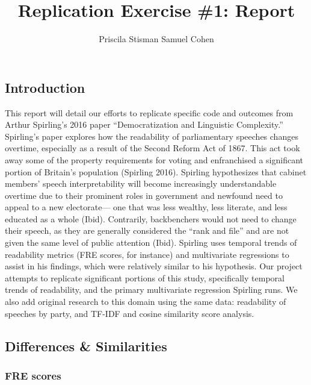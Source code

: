 \documentclass[
  letterpaper,
  DIV=11,
  numbers=noendperiod]{scrartcl}
\title{Replication Exercise \#1: Report}
\author{Priscila Stisman \textbar{} Samuel Cohen}
\date{}
\renewcommand*\contentsname{Table of contents}
\newcommand\contentsname{Table of contents}
\begin{document}
\maketitle

\renewcommand*\contentsname{Table of contents}
{
\hypersetup{linkcolor=}
\setcounter{tocdepth}{3}
\tableofcontents
}

\subsection{Introduction}\label{introduction}

This report will detail our efforts to replicate specific code and
outcomes from Arthur Spirling's 2016 paper ``Democratization and
Linguistic Complexity.'' Spirling's paper explores how the readability
of parliamentary speeches changes overtime, especially as a result of
the Second Reform Act of 1867. This act took away some of the property
requirements for voting and enfranchised a significant portion of
Britain's population (Spirling 2016). Spirling hypothesizes that cabinet
members' speech interpretability will become increasingly understandable
overtime due to their prominent roles in government and newfound need to
appeal to a new electorate--- one that was less wealthy, less literate,
and less educated as a whole (Ibid). Contrarily, backbenchers would not
need to change their speech, as they are generally considered the ``rank
and file'' and are not given the same level of public attention (Ibid).
Spirling uses temporal trends of readability metrics (FRE scores, for
instance) and multivariate regressions to assist in his findings, which
were relatively similar to his hypothesis. Our project attempts to
replicate significant portions of this study, specifically temporal
trends of readability, and the primary multivariate regression Spirling
runs. We also add original research to this domain using the same data:
readability of speeches by party, and TF-IDF and cosine similarity score
analysis.

\subsection{Differences \& Similarities}\label{differences-similarities}

\subsubsection{FRE scores}\label{fre-scores}
\end{document}
